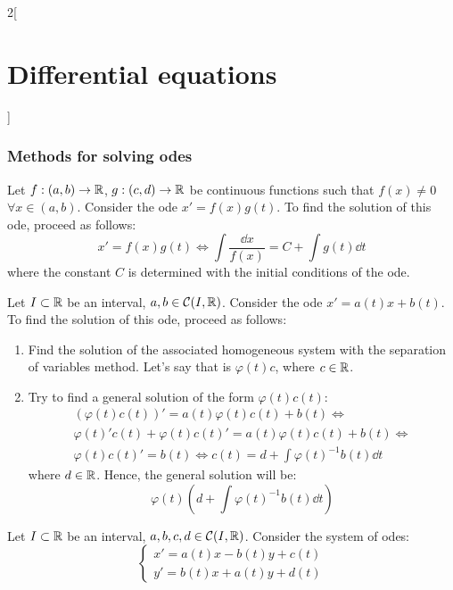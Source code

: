 \documentclass[../../../main.tex]{subfiles}
\begin{document}
\begin{multicols}{2}[\section{Differential equations}]
    \subsubsection{Methods for solving odes}
    \begin{method}
        Let $f:(a,b)\rightarrow\mathbb{R}$, $g:(c,d)\rightarrow\mathbb{R}$ be continuous functions such that $f(x)\ne 0$ $\forall x\in (a,b)$. Consider the ode $x'=f(x)g(t)$. To find the solution of this ode, proceed as follows:
        $$x'=f(x)g(t)\iff \int\frac{\dd x}{f(x)}=C+\int g(t)\dd t$$ where the constant $C$ is determined with the initial conditions of the ode.
    \end{method}
    \begin{method}
        Let $I\subset \mathbb{R}$ be an interval, $a,b\in\mathcal{C}(I,\mathbb{R})$. Consider the ode $x'=a(t)x+b(t)$. To find the solution of this ode, proceed as follows:
        \begin{enumerate}
            \item Find the solution of the associated homogeneous system with the separation of variables method. Let's say that is $\varphi(t)c$, where $c\in\mathbb{R}$.
            \item Try to find a general solution of the form $\varphi(t)c(t)$:
                  \begin{multline*}
                      \left(\varphi(t)c(t)\right)'=a(t)\varphi(t)c(t)+b(t)\iff\\\varphi(t)'c(t)+\varphi(t)c(t)'=a(t)\varphi(t)c(t)+b(t)\iff\\\varphi(t)c(t)'=b(t)\iff c(t)=d+\int\varphi(t)^{-1}b(t)\dd t
                  \end{multline*}
                  where $d\in\mathbb{R}$. Hence, the general solution will be: $$\varphi(t)\left(d+\int\varphi(t)^{-1}b(t)\dd t\right)$$
        \end{enumerate}
    \end{method}
    \begin{method}
        Let $I\subset \mathbb{R}$ be an interval, $a,b,c,d\in\mathcal{C}(I,\mathbb{R})$. Consider the system of odes:
        \begin{equation}\label{DE_ode-complex}
            \left\{
            \begin{aligned}
                x'=a(t)x-b(t)y+c(t) \\
                y'=b(t)x+a(t)y+d(t)
            \end{aligned}
            \right.
        \end{equation}

\end{method}
\end{multicols}
\end{document}
